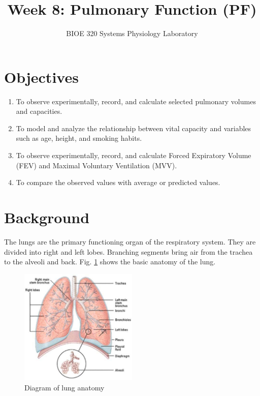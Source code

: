 \documentclass{article}
\title{Week 8: Pulmonary Function (PF)}
\author{BIOE 320 Systems Physiology Laboratory}
\date{}
\begin{document}
\large
\maketitle

\section*{Objectives}
\begin{enumerate}
	\item To observe experimentally, record, and calculate selected pulmonary volumes and capacities.
	\item To model and analyze the relationship between vital capacity and variables such as age, height, and smoking habits.
	\item To observe experimentally, record, and calculate Forced Expiratory Volume (FEV) and Maximal Voluntary Ventilation (MVV).
	\item To compare the observed values with average or predicted values.
\end{enumerate}

\section*{Background}

The lungs are the primary functioning organ of the respiratory system. They are divided into right and left lobes. Branching segments bring air from the trachea to the alveoli and back. Fig. \ref{lung} shows the basic anatomy of the lung.

\begin{figure}[h]
\centering\includegraphics[width=0.5\textwidth]{../images/PF_I_1.jpg}
\caption{Diagram of lung anatomy}
\label{lung}
\end{figure}
\end{document}
